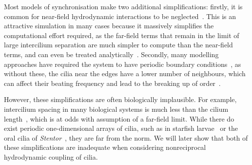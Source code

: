 Most models of synchronisation make two additional simplifications: firstly, it is common for near-field hydrodynamic interactions to be neglected~\cite{meng_conditions_2021, niedermayer_synchronization_2008}. This is an attractive simulation in many cases because it massively simplifies the computational effort required, as the far-field terms that remain in the limit of large intercilium separation are much simpler to compute than the near-field terms, and can even be treated analytically~\cite{niedermayer_synchronization_2008}. Secondly, many modelling approaches have required the system to have periodic boundary conditions~\cite{niedermayer_synchronization_2008, meng_conditions_2021, wollin_metachronal_2011, uchida_synchronization_2010}, as without these, the cilia near the edges have a lower number of neighbours, which can affect their beating frequency and lead to the breaking up of order~\cite{kavre_hydrodynamic_2015, hamilton_chimera_2017, niedermayer_synchronization_2008}.

However, these simplifications are often biologically implausible. For example, intercilium spacing in many biological systems is much less than the cilium length~, which is at odds with assumption of a far-field limit. While there do exist periodic one-dimensional arrays of cilia, such as in starfish larvae~ or the oral cilia of \textit{Stentor}~, they are far from the norm. We will later show that both of these simplifications are inadequate when considering nonreciprocal hydrodynamic coupling of cilia.



